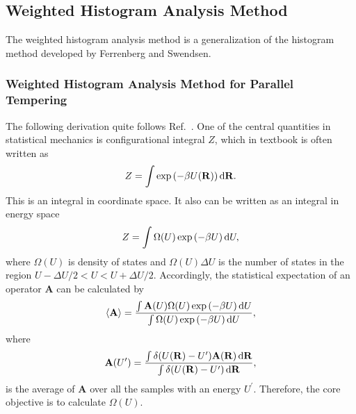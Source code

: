 \subsection{Weighted Histogram Analysis Method\label{Sec:FEM:WHAM}}
The weighted histogram analysis method is a generalization of the histogram method developed by Ferrenberg and Swendsen.\cite{FerrenbergPRL1989}
\subsubsection{Weighted Histogram Analysis Method for Parallel Tempering\label{Sec:FEM:WHAM_REMD}}
The following derivation quite follows Ref.~\cite{ChoderaJCTC2007}.
One of the central quantities in statistical mechanics is configurational integral $Z$, which in textbook is often written as
\begin{equation}
Z=\int \exp{(-\beta U(\mathbf{R}))}\mathop{}\!\mathrm{d}\mathbf{R}.
\end{equation}
This is an integral in coordinate space. It also can be written as an integral in energy space
\begin{equation}
Z=\int \Omega(U)\exp{(-\beta U)}\mathop{}\!\mathrm{d} U,
\end{equation}
where $\Omega(U)$ is density of states and $\Omega(U)\Delta U$ is the number of states in the region $U-\Delta U/2<U<U+\Delta U/2$. Accordingly, the statistical expectation of an operator $\mathbf{A}$ can be calculated by
\begin{equation}
\langle \mathbf{A}\rangle=\frac {\int \mathbf{A}(U)\Omega(U)\exp{(-\beta U)}\mathop{}\!\mathrm{d} U}{\int \Omega(U)\exp{(-\beta U)}\mathop{}\!\mathrm{d} U},
\end{equation}
where
\begin{equation}
\mathbf{A}(U^\prime)=\frac{\int \delta (U(\mathbf{R})-U^\prime)\mathbf{A}(\mathbf{R})\mathop{}\!\mathrm{d} \mathbf{R}}{\int \delta (U(\mathbf{R})-U^\prime)\mathop{}\!\mathrm{d}\mathbf{R}},
\end{equation}
is the average of $\mathbf{A}$ over all the samples with an energy $U^\prime$. Therefore, the core objective is to calculate $\Omega(U)$.

